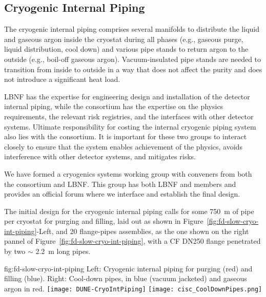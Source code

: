 \subsection{Cryogenic Internal Piping}
\label{sec:fdgen-slow-cryo-int-piping}
\label{sec:fdsp-slow-cryo-int-piping}
\label{sec:fddp-slow-cryo-int-piping}


The cryogenic internal piping comprises several manifolds to
distribute the liquid and gaseous argon inside the cryostat during all
phases (e.g., gaseous purge, liquid distribution, cool down) and
various pipe stands to return argon to the outside (e.g.,
boil-off gaseous argon).  Vacuum-insulated pipe stands are needed to
transition from inside to outside in a way that does not affect the
purity and does not introduce a significant heat load.

LBNF has the expertise for engineering design and installation of the
detector internal piping, while the  consortium has the expertise
on the physics requirements, the relevant risk registries, and the
interfaces with other detector systems. Ultimate responsibility for
costing the internal cryogenic piping system also lies with the 
consortium. It is important for these two groups to interact closely
to ensure that the system enables achievement of the physics, %
avoids interference with other detector systems, and mitigates
risks.

We have formed a cryogenics systems working group with conveners from
both the  consortium and LBNF. This group has both LBNF and
 members and provides an official forum where we interface and
establish the final design.

The initial design for the cryogenic internal piping calls for some
\SI{750}{m} of pipe per cryostat for purging and filling, laid out as
shown in Figure~\ref{fig:fd-slow-cryo-int-piping}-Left, and 20 flange-pipes assemblies, as the one shown
on the right pannel of Figure~\ref{fig:fd-slow-cryo-int-piping}, with a CF DN250 flange penetrated by two $\sim$ \SI{2.2}{m} long pipes.

\begin{dunefigure}{fig:fd-slow-cryo-int-piping}
  {Left: Cryogenic internal piping for purging (red) and filling (blue). Right: Cool-down pipes, \lar in blue (vacuum jacketed) and gaseous argon in red. }
  \texttt{[image: DUNE-CryoIntPiping]}
  \texttt{[image: cisc\_CoolDownPipes.png]}
\end{dunefigure}




